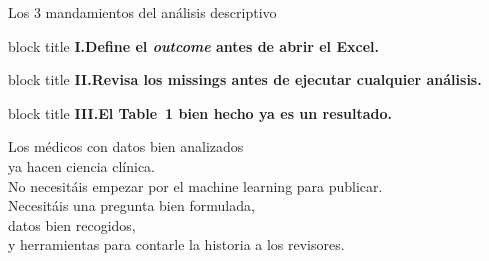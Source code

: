 \documentclass[aspectratio=169,10pt]{beamer}
\begin{document}
\begin{frame}{Los 3 mandamientos del análisis descriptivo}
  \begin{center}
    \vspace{5mm}
    \begin{beamercolorbox}[sep=12pt,center,rounded=true,shadow=true]{block title}
      \large\bfseries I.\quad Define el \textit{outcome} \textbf{antes} de abrir el Excel.
    \end{beamercolorbox}
    \vspace{5mm}
    \begin{beamercolorbox}[sep=12pt,center,rounded=true,shadow=true]{block title}
      \large\bfseries II.\quad Revisa los missings antes de ejecutar cualquier análisis.
    \end{beamercolorbox}
    \vspace{5mm}
    \begin{beamercolorbox}[sep=12pt,center,rounded=true,shadow=true]{block title}
      \large\bfseries III.\quad El Table~1 bien hecho \textbf{ya es un resultado.}
    \end{beamercolorbox}
  \end{center}
\end{frame}

\begin{frame}
  \begin{center}
    \vspace{6mm}
    {\LARGE Los médicos con datos bien analizados}\\[3mm]
    {\LARGE ya hacen ciencia clínica.}
    \vspace{6mm}\\
    {\large No necesitáis empezar por el machine learning para publicar.}\\[3mm]
    {\large Necesitáis una pregunta bien formulada,}\\[2mm]
    {\large datos bien recogidos,}\\[2mm]
    {\large y herramientas para contarle la historia a los revisores.}
  \end{center}
\end{frame}

\begin{frame}
  \titlepage
\end{frame}
\end{document}
